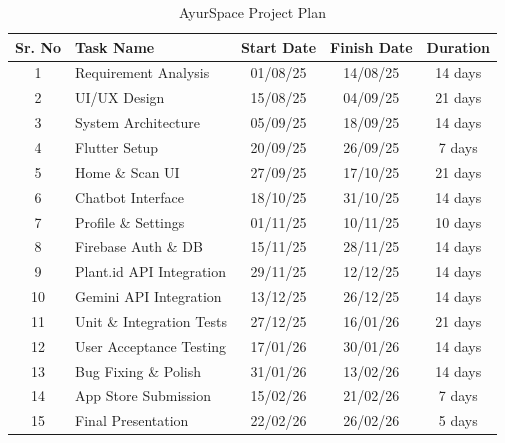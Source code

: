 \setcounter{table}{1}
\begin{table}[!htbp]
\caption{AyurSpace Project Plan}
\label{tab:project_plan}
\centering
\renewcommand{\arraystretch}{1.3}
\begin{tabular}{|c|p{5.5cm}|c|c|c|}
\hline
\textbf{Sr. No} & \textbf{Task Name} & \textbf{Start Date} & \textbf{Finish Date} & \textbf{Duration} \\
\hline
1  & Requirement Analysis          & 01/08/25 & 14/08/25 & 14 days \\
\hline
2  & UI/UX Design                  & 15/08/25 & 04/09/25 & 21 days \\
\hline
3  & System Architecture           & 05/09/25 & 18/09/25 & 14 days \\
\hline
4  & Flutter Setup                 & 20/09/25 & 26/09/25 & 7 days  \\
\hline
5  & Home \& Scan UI               & 27/09/25 & 17/10/25 & 21 days \\
\hline
6  & Chatbot Interface             & 18/10/25 & 31/10/25 & 14 days \\
\hline
7  & Profile \& Settings           & 01/11/25 & 10/11/25 & 10 days \\
\hline
8  & Firebase Auth \& DB           & 15/11/25 & 28/11/25 & 14 days \\
\hline
9  & Plant.id API Integration      & 29/11/25 & 12/12/25 & 14 days \\
\hline
10 & Gemini API Integration        & 13/12/25 & 26/12/25 & 14 days \\
\hline
11 & Unit \& Integration Tests     & 27/12/25 & 16/01/26 & 21 days \\
\hline
12 & User Acceptance Testing       & 17/01/26 & 30/01/26 & 14 days \\
\hline
13 & Bug Fixing \& Polish          & 31/01/26 & 13/02/26 & 14 days \\
\hline
14 & App Store Submission          & 15/02/26 & 21/02/26 & 7 days  \\
\hline
15 & Final Presentation            & 22/02/26 & 26/02/26 & 5 days  \\
\hline
\end{tabular}
\end{table}

